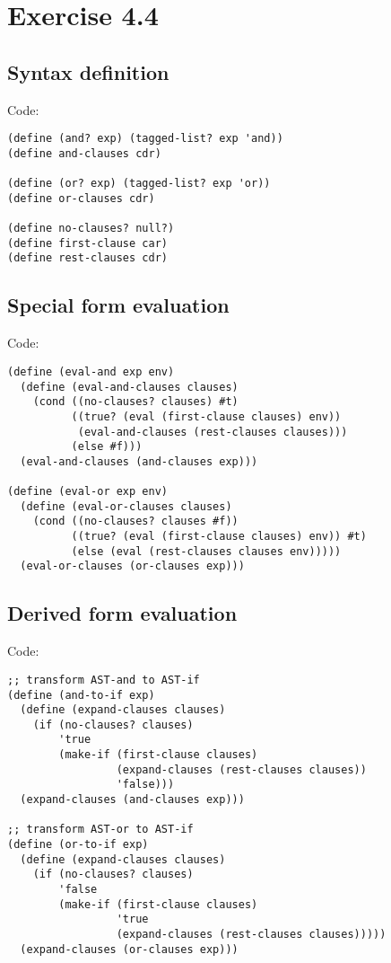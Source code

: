 \documentclass[../main.tex]{subfiles}
\begin{document}
\section{Exercise 4.4}

\subsection{Syntax definition}

Code:

\begin{lstlisting}
(define (and? exp) (tagged-list? exp 'and))
(define and-clauses cdr)

(define (or? exp) (tagged-list? exp 'or))
(define or-clauses cdr)

(define no-clauses? null?)
(define first-clause car)
(define rest-clauses cdr)
\end{lstlisting}

\subsection{Special form evaluation}

Code:

\begin{lstlisting}
(define (eval-and exp env)
  (define (eval-and-clauses clauses)
    (cond ((no-clauses? clauses) #t)
          ((true? (eval (first-clause clauses) env))
           (eval-and-clauses (rest-clauses clauses)))
          (else #f)))
  (eval-and-clauses (and-clauses exp)))

(define (eval-or exp env)
  (define (eval-or-clauses clauses)
    (cond ((no-clauses? clauses #f))
          ((true? (eval (first-clause clauses) env)) #t)
          (else (eval (rest-clauses clauses env)))))
  (eval-or-clauses (or-clauses exp)))
\end{lstlisting}

\subsection{Derived form evaluation}

Code:

\begin{lstlisting}
;; transform AST-and to AST-if
(define (and-to-if exp)
  (define (expand-clauses clauses)
    (if (no-clauses? clauses)
        'true
        (make-if (first-clause clauses)
                 (expand-clauses (rest-clauses clauses))
                 'false)))
  (expand-clauses (and-clauses exp)))

;; transform AST-or to AST-if
(define (or-to-if exp)
  (define (expand-clauses clauses)
    (if (no-clauses? clauses)
        'false
        (make-if (first-clause clauses)
                 'true
                 (expand-clauses (rest-clauses clauses)))))
  (expand-clauses (or-clauses exp)))
\end{lstlisting}
\end{document}
